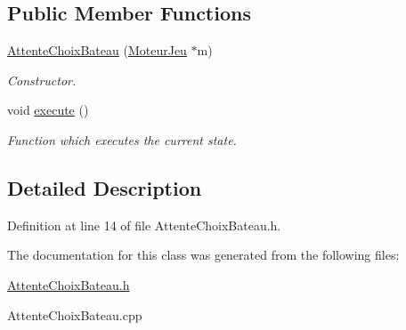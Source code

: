\subsection*{Public Member Functions}
\begin{DoxyCompactItemize}
\item 
\hypertarget{class_attente_choix_bateau_a4c9160da73e4cec627c83f689abf9db0}{
\hyperlink{class_attente_choix_bateau_a4c9160da73e4cec627c83f689abf9db0}{AttenteChoixBateau} (\hyperlink{class_moteur_jeu}{MoteurJeu} $\ast$m)}
\label{class_attente_choix_bateau_a4c9160da73e4cec627c83f689abf9db0}

\begin{DoxyCompactList}\small\item\em Constructor. \item\end{DoxyCompactList}\item 
\hypertarget{class_attente_choix_bateau_a605cddd03d3c37ec5c7e48a71251998f}{
void \hyperlink{class_attente_choix_bateau_a605cddd03d3c37ec5c7e48a71251998f}{execute} ()}
\label{class_attente_choix_bateau_a605cddd03d3c37ec5c7e48a71251998f}

\begin{DoxyCompactList}\small\item\em Function which executes the current state. \item\end{DoxyCompactList}\end{DoxyCompactItemize}


\subsection{Detailed Description}


Definition at line 14 of file AttenteChoixBateau.h.



The documentation for this class was generated from the following files:\begin{DoxyCompactItemize}
\item 
\hyperlink{_attente_choix_bateau_8h}{AttenteChoixBateau.h}\item 
AttenteChoixBateau.cpp\end{DoxyCompactItemize}
